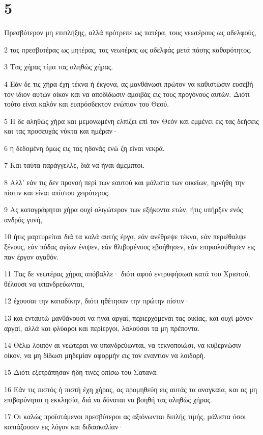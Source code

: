 \chapter{5}

\par Πρεσβύτερον μη επιπλήξης, αλλά πρότρεπε ως πατέρα, τους νεωτέρους ως αδελφούς,
\par 2 τας πρεσβυτέρας ως μητέρας, τας νεωτέρας ως αδελφάς μετά πάσης καθαρότητος.
\par 3 Τας χήρας τίμα τας αληθώς χήρας.
\par 4 Εάν δε τις χήρα έχη τέκνα ή έκγονα, ας μανθάνωσι πρώτον να καθιστώσιν ευσεβή τον ίδιον αυτών οίκον και να αποδίδωσιν αμοιβάς εις τους προγόνους αυτών. Διότι τούτο είναι καλόν και ευπρόσδεκτον ενώπιον του Θεού.
\par 5 Η δε αληθώς χήρα και μεμονωμένη ελπίζει επί τον Θεόν και εμμένει εις τας δεήσεις και τας προσευχάς νύκτα και ημέραν·
\par 6 η δεδομένη όμως εις τας ηδονάς ενώ ζη είναι νεκρά.
\par 7 Και ταύτα παράγγελλε, διά να ήναι άμεμπτοι.
\par 8 Αλλ' εάν τις δεν προνοή περί των εαυτού και μάλιστα των οικείων, ηρνήθη την πίστιν και είναι απίστου χειρότερος.
\par 9 Ας καταγράφηται χήρα ουχί ολιγώτερον των εξήκοντα ετών, ήτις υπήρξεν ενός ανδρός γυνή,
\par 10 ήτις μαρτυρείται διά τα καλά αυτής έργα, εάν ανέθρεψε τέκνα, εάν περιέθαλψε ξένους, εάν πόδας αγίων ένιψεν, εάν θλιβομένους εβοήθησεν, εάν επηκολούθησεν εις παν έργον αγαθόν.
\par 11 Τας δε νεωτέρας χήρας απόβαλλε· διότι αφού εντρυφήσωσι κατά του Χριστού, θέλουσι να υπανδρεύωνται,
\par 12 έχουσαι την καταδίκην, διότι ηθέτησαν την πρώτην πίστιν·
\par 13 και ενταυτώ μανθάνουσι να ήναι αργαί, περιερχόμεναι τας οικίας, και ουχί μόνον αργαί, αλλά και φλύαροι και περίεργοι, λαλούσαι τα μη πρέποντα.
\par 14 Θέλω λοιπόν αι νεώτεραι να υπανδρεύωνται, να τεκνοποιώσι, να κυβερνώσιν οίκον, να μη δίδωσι μηδεμίαν αφορμήν εις τον εναντίον να λοιδορή.
\par 15 Διότι εξετράπησαν ήδη τινές οπίσω του Σατανά.
\par 16 Εάν τις πιστός ή πιστή έχη χήρας, ας προμηθεύη εις αυτάς τα αναγκαία, και ας μη επιβαρύνηται η εκκλησία, διά να δύναται να βοηθή τας αληθώς χήρας.
\par 17 Οι καλώς προϊστάμενοι πρεσβύτεροι ας αξιόνωνται διπλής τιμής, μάλιστα όσοι κοπιάζουσιν εις λόγον και διδασκαλίαν·
